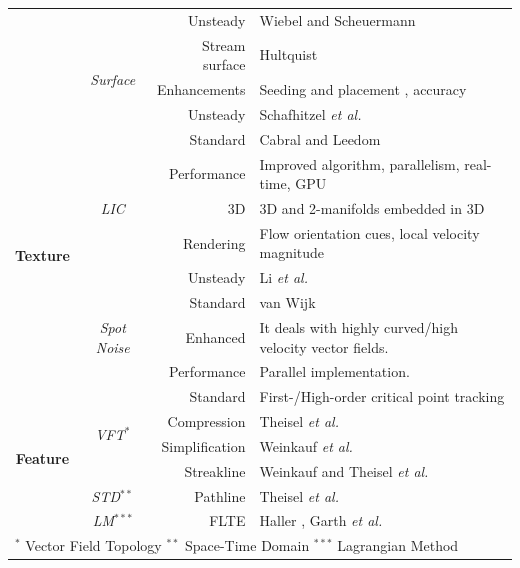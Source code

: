 \begin{table}
\begin{tabular}{c c r p{7.25cm}}
						&						& \cc Unsteady		& \cc Wiebel and Scheuermann \cite{wiebel2005eyelet}\\
						&\multirow{3}{*}{\em Surface}	& Stream surface  	& Hultquist \cite{Hultquist:1992:CSS:949685.949718}\\
						&						& Enhancements	& Seeding and placement \cite{Peikert:2009:TRS:1980462.1980472}, accuracy \cite{Garth:2008:GAI:1477066.1477441}\\
						&						& Unsteady		& Schafhitzel \emph{et al.} \cite{Schafhitzel:2007:PSS:1268517.1268564}\\
\hline
\multirow{8}{*}{\bf Texture}&\multirow{5}{*}{\em LIC}		&\cc Standard		&\cc Cabral and Leedom \cite{Cabral:1993uu} \\
					& 							&\cc Performance	&\cc Improved algorithm, parallelism, real-time, GPU \cite{Li:2006:GIA:2384796.2384800}\\
					& 							&\cc 3D			&\cc 3D and 2-manifolds embedded in 3D \cite{10.1109/TVCG.2010.121}\\
					& 							&\cc Rendering		&\cc Flow orientation cues, local velocity magnitude\\
					& 							&\cc Unsteady 		&\cc Li \emph{et al.} \cite{Li:2006:GIA:2384796.2384800}\\
					&\multirow{3}{*}{\em Spot Noise}	& Standard			& van Wijk \cite{vanWijk:1991vd} \\
					& 							& Enhanced 		& It deals with highly curved/high velocity vector fields. \cite{deLeeuw:1995tp} \\
					& 							& Performance		& Parallel implementation. \cite{Leeuw:1997vr} \\
\hline
\multirow{6}{*}{\bf Feature}	&\multirow{4}{*}{\em VFT$^{*}$}	&\cc Standard		&\cc First-/High-order critical point tracking \cite{Helman:1989:RDV:72885.72887,de1999visualization,Scheuermann:1998:VNV:614270.614397} \\
						& 							&\cc Compression 	&\cc Theisel \emph{et al.} \cite{CGF:CGF680}\\
						&							&\cc Simplification	&\cc Weinkauf \emph{et al.} \cite{weinkauf05a}\\
						& 							&\cc Streakline 		&\cc Weinkauf and Theisel \emph{et al.} \cite{Weinkauf:2010:SLT:1907651.1908009}\\
						&\multirow{1}{*}{\em STD$^{**}$}	& Pathline			&Theisel \emph{et al.} \cite{Theisel:2005:TMT:1070610.1070741} \\
						&\multirow{1}{*}{\em LM$^{***}$}	&\cc FLTE			&\cc Haller \cite{Haller:2001:DMS:370169.370176},  Garth \emph{et al.} \cite{Garth:2007:ECV:1313046.1313106}\\
\hline
\multicolumn{4}{l}{$^{*}$ Vector Field Topology $^{**}$ Space-Time Domain $^{***}$ Lagrangian Method}\\
\bottomrule
\end{tabular}
\end{table}

